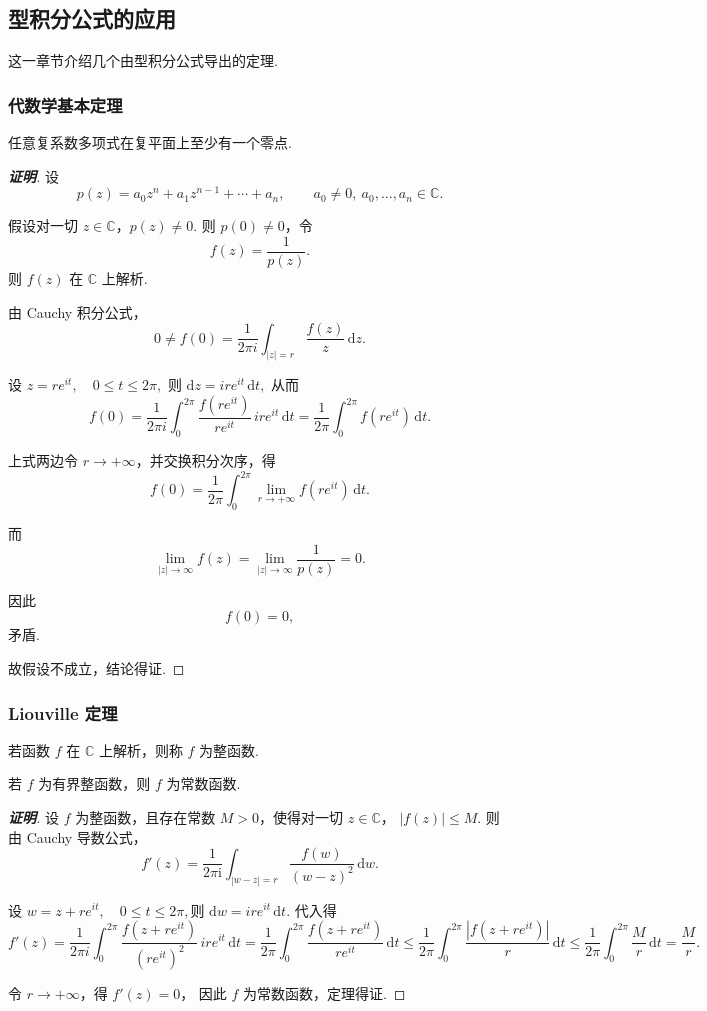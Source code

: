 \documentclass[openany,oneside]{ctexbook}
\begin{document}
\subsection{型积分公式的应用}
这一章节介绍几个由型积分公式导出的定理.
\subsubsection{代数学基本定理}
\begin{theorem}
  任意复系数多项式在复平面上至少有一个零点.
\end{theorem}
\begin{proof}[\textbf{证明}]
设
\[
p(z)=a_0 z^n + a_1 z^{n-1} + \cdots + a_n,
\qquad a_0\neq 0,\ a_0,\dots,a_n\in\mathbb{C}.
\]

假设对一切 $z\in\mathbb{C}$，$p(z)\neq 0$.
则 $p(0)\neq 0$，令
\[
f(z)=\frac{1}{p(z)}.
\]
则 $f(z)$ 在 $\mathbb{C}$ 上解析.

由 Cauchy 积分公式，
\[
0\neq f(0)
=
\frac{1}{2\pi i}
\int_{|z|=r}
\frac{f(z)}{z}\,\mathrm{d}z.
\]

设
$
z=re^{it},\quad 0\le t\le 2\pi,
$
则
$
\mathrm{d}z=ire^{it}\,\mathrm{d}t,
$
从而
\[
f(0)
=
\frac{1}{2\pi i}
\int_0^{2\pi}
\frac{f(re^{it})}{re^{it}}
\, ire^{it}\,\mathrm{d}t
=
\frac{1}{2\pi}
\int_0^{2\pi}
f(re^{it})\,\mathrm{d}t.
\]

上式两边令 $r\to +\infty$，并交换积分次序，得
\[
f(0)
=
\frac{1}{2\pi}
\int_0^{2\pi}
\lim_{r\to+\infty}
f(re^{it})\,\mathrm{d}t.
\]

而
\[
\lim_{|z|\to\infty} f(z)
=
\lim_{|z|\to\infty}
\frac{1}{p(z)}
=
0.
\]

因此
\[
f(0)=0,
\]
矛盾.

故假设不成立，结论得证.
\end{proof}
\subsubsection{Liouville 定理}
\begin{definition}
  若函数 $f$ 在 $\mathbb{C}$ 上解析，则称 $f$ 为整函数.
\end{definition}
\begin{theorem}[Liouville 定理]
  若 $f$ 为有界整函数，则 $f$ 为常数函数.
\end{theorem}
\begin{proof}[\textbf{证明}]
设 $f$ 为整函数，且存在常数 $M>0$，使得对一切 $z\in\mathbb{C}$，
$
|f(z)|\le M.
$
则由 Cauchy 导数公式，
\[
f'(z)
=
\frac{1}{2\pi \mathrm{i}}
\int_{|w-z|=r}
\frac{f(w)}{(w-z)^2}\,\mathrm{d}w.
\]

设
$
w=z+re^{it}, \quad 0\le t\le 2\pi,
$则
$
\mathrm{d}w=ire^{it}\,\mathrm{d}t.
$
代入得
\[
f'(z)
=
\frac{1}{2\pi i}
\int_0^{2\pi}
\frac{f(z+re^{it})}{(re^{it})^2}
\, ire^{it}\,\mathrm{d}t
=
\frac{1}{2\pi}
\int_0^{2\pi}
\frac{f(z+re^{it})}{re^{it}}\,\mathrm{d}t
\le
\frac{1}{2\pi}
\int_0^{2\pi}
\frac{|f(z+re^{it})|}{r}\,\mathrm{d}t
\le
\frac{1}{2\pi}
\int_0^{2\pi}
\frac{M}{r}\,\mathrm{d}t
=
\frac{M}{r}.
\]

令 $r\to +\infty$，得
$
f'(z)=0
$，
因此 $f$ 为常数函数，定理得证.
\end{proof}
\end{document}
